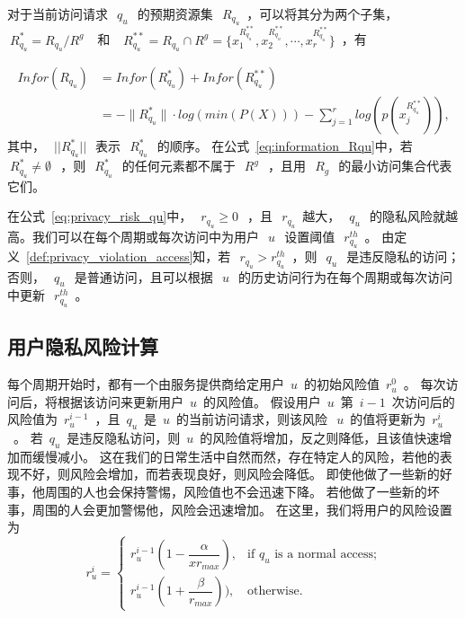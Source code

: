 对于当前访问请求~$~q_u~$~的预期资源集~$~R_{q_u}$~，可以将其分为两个子集， ~$~R_{q_u}^* = R_{q_u}/R^g~$~ 和 ~$~R_{q_u}^{**} = R_{q_u} \cap R^g = \{x_1^{R_{q_u}^{**}},x_2^{R_{q_u}^{**}},\cdots, x_r^{R_{q_u}^{**}}\}$~，有

\begin{equation}\label{eq:information_Rqu}
\begin{split}
Infor(R_{q_u})&=Infor(R_{q_u}^{*})  +Infor(R_{q_u}^{**})
\\&=-\|R_{q_u}^*\|\cdot log(min(P(X)))-\sum_{j=1}^r log(p(x_j^{R_{q_u}^{**}})),
\end{split}
\end{equation}
其中，~$~||R_{q_u}^*||~$~表示~$~R_{q_u}^*~$~的顺序。 在公式~\ref{eq:information_Rqu}中，若~$~R_{q_u}^* \neq \emptyset~$~，则~$~R_{q_u}^*~$~的任何元素都不属于~$~R^g~$~，且用~$~R_g~$~的最小访问集合代表它们。

在公式~\ref{eq:privacy_risk_qu}中，~$~r_{q_u} \geq 0~$~，且~$~r_{q_u}$~越大，~$~q_u~$~的隐私风险就越高。我们可以在每个周期或每次访问中为用户~$~u~$~设置阈值~$~r_{q_u}^{th}$~。 由定义~\ref{def:privacy_violation_access}知，若~$~r_{q_u} > r_{q_u}^{th}$~，则~$~q_u~$~是违反隐私的访问；否则，~$~q_u~$~是普通访问，且可以根据~$~u~$~的历史访问行为在每个周期或每次访问中更新~$~r_{q_u}^{th}$~。

\subsection{用户隐私风险计算}

每个周期开始时，都有一个由服务提供商给定用户~${u}$~的初始风险值~${r_u ^ 0}$~。 每次访问后，将根据该访问来更新用户~${u}$~的风险值。 假设用户~${u}$~第~${{i-1}}$~次访问后的风险值为~${r_u ^ {i-1}}$~，且~${q_u}$~是~${u}$~的当前访问请求，则该风险~$~ {u}$~的值将更新为~${r_u ^ {i}}$~。 若~${q_u}$~是违反隐私访问，则~${u}$~的风险值将增加，反之则降低，且该值快速增加而缓慢减小。 这在我们的日常生活中自然而然，存在特定人的风险，若他的表现不好，则风险会增加，而若表现良好，则风险会降低。 即使他做了一些新的好事，他周围的人也会保持警惕，风险值也不会迅速下降。 若他做了一些新的坏事，周围的人会更加警惕他，风险会迅速增加。 在这里，我们将用户的风险设置为
\begin{equation}\label{eq:userrisk}
r_u^{i}=\left\{ 
\begin{array}{cl}
r_u^{i-1}(1-\dfrac{\alpha}{xr_{max}}), & \text{if } q_u \text{ is a normal access;}\\
r_u^{i-1}(1+\dfrac{\beta}{r_{max}})), & \text{otherwise.}
\end{array}
\right.
\end{equation}

